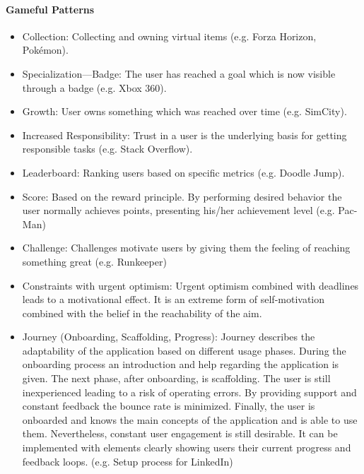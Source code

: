 \paragraph*{Gameful Patterns}
\label{GamefulPatterns}
\begin{itemize}
	\item Collection: Collecting and owning virtual items (e.g. Forza Horizon, Pokémon). \cite[p. 4, 35]{lewisIrresistibleAppsMotivational2014}
	\item Specialization—Badge: The user has reached a goal which is now visible through a badge (e.g. Xbox 360). \cite[p. 4, 37]{lewisIrresistibleAppsMotivational2014}
	\item Growth: User owns something which was reached over time (e.g. SimCity). \cite[p. 4, 40]{lewisIrresistibleAppsMotivational2014}
	\item Increased Responsibility: Trust in a user is the underlying basis for getting responsible tasks (e.g. Stack Overflow). \cite[p. 4, 41]{lewisIrresistibleAppsMotivational2014}
	\item Leaderboard: Ranking users based on specific metrics (e.g. Doodle Jump). \cite[p. 4, 44]{lewisIrresistibleAppsMotivational2014}
	\item Score: Based on the reward principle. By performing desired behavior the user normally achieves points, presenting his/her achievement level (e.g. Pac-Man) \cite[p. 4, 46]{lewisIrresistibleAppsMotivational2014}
	\item Challenge: Challenges motivate users by giving them the feeling of reaching something great (e.g. Runkeeper) \cite[p. 77, 78]{kumarGamificationWorkDesigning2013}
	\item Constraints with urgent optimism: Urgent optimism combined with deadlines leads to a motivational effect. It is an extreme form of self-motivation combined with the belief in the reachability of the aim. \cite[p. 78]{kumarGamificationWorkDesigning2013}
	\item Journey (Onboarding, Scaffolding, Progress): Journey describes the adaptability of the application based on different usage phases. During the onboarding process an introduction and help regarding the application is given. The next phase, after onboarding, is scaffolding. The user is still inexperienced leading to a risk of operating errors. By providing support and constant feedback the bounce rate is minimized. Finally, the user is onboarded and knows the main concepts of the application and is able to use them. Nevertheless, constant user engagement is still desirable. It can be implemented with elements clearly showing users their current progress and feedback loops. (e.g. Setup process for LinkedIn) \cite[p. 80, 81, 82]{kumarGamificationWorkDesigning2013}
\end{itemize}

